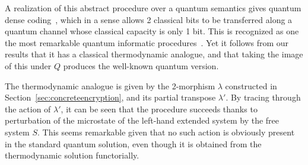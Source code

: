 \documentclass[a4paper,12pt]{article}
\theoremstyle{definition}
\renewcommand{\-}[0]{\nobreakdash-\hspace{0pt}}
\begin{document}
A realization of this abstract procedure over a quantum semantics gives quantum dense coding~\cite{v12-hqt}, which in a sense allows 2 classical bits to be transferred along a quantum channel whose classical capacity is only 1 bit. This is recognized as one the most remarkable quantum informatic procedures~\cite{bw92}. Yet it follows from our results that it has a classical thermodynamic analogue, and that taking the image of this under $Q$ produces the well-known quantum version.

The thermodynamic analogue is given by the 2\-morphism $\lambda$ constructed in Section~\ref{sec:concreteencryption}, and its partial transpose $\lambda'$. By tracing through the action of $\lambda'$, it can be seen that the procedure succeeds thanks to perturbation of the microstate of the left-hand extended system by the free system $S$. This seems remarkable given that no such action is obviously present in the standard quantum solution, even though it is obtained from the thermodynamic solution functorially.

\newlength\mybibindent
\setlength\mybibindent{-17pt}
\makeatletter
\renewenvironment{thebibliography}[1]
     {\section*{\bibname}\@mkboth{\MakeUppercase\bibname}{\MakeUppercase\bibname}\list{\@biblabel{\@arabic\c@enumiv}}{\settowidth\labelwidth{\@biblabel{1}}\leftmargin\labelwidth
            \advance\leftmargin\dimexpr\labelsep+\mybibindent\relax\itemindent-\mybibindent \@openbib@code
            \usecounter{enumiv}\let\p@enumiv\@empty
            \renewcommand\theenumiv{\@arabic\c@enumiv}}\sloppy
      \clubpenalty4000
      \@clubpenalty \clubpenalty
      \widowpenalty4000\sfcode`\.\@m}
     {\def\@noitemerr
       {\@latex@warning{Empty `thebibliography' environment}}\endlist}
\makeatother



\end{document}
